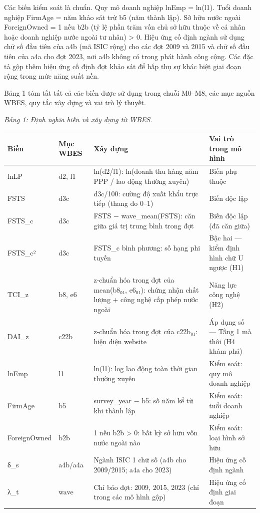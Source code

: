 \documentclass[12pt,a4paper]{article}
\begin{document}
Các biến kiểm soát là chuẩn. Quy mô doanh nghiệp lnEmp = ln(l1). Tuổi
doanh nghiệp FirmAge = năm khảo sát trừ b5 (năm thành lập). Sở hữu nước
ngoài ForeignOwned = 1 nếu b2b (tỷ lệ phần trăm vốn chủ sở hữu thuộc về
cá nhân hoặc doanh nghiệp nước ngoài tư nhân) \textgreater{} 0. Hiệu ứng
cố định ngành sử dụng chữ số đầu tiên của a4b (mã ISIC rộng) cho các đợt
2009 và 2015 và chữ số đầu tiên của a4a cho đợt 2023, nơi a4b không có
trong phát hành công cộng. Các đặc tả gộp thêm hiệu ứng cố định đợt khảo
sát để hấp thụ sự khác biệt giai đoạn rộng trong mức năng suất nền.

Bảng 1 tóm tắt tất cả các biến được sử dụng trong chuỗi M0--M8, các mục
nguồn WBES, quy tắc xây dựng và vai trò lý thuyết.

\emph{Bảng 1: Định nghĩa biến và xây dựng từ WBES.}

\begin{longtable}[]{@{}llll@{}}
\toprule\noalign{}
Biến & Mục WBES & Xây dựng & Vai trò trong mô hình \\
\midrule\noalign{}
\endhead
\bottomrule\noalign{}
\endlastfoot
lnLP & d2, l1 & ln(d2/l1): ln(doanh thu hàng năm PPP / lao động thường
xuyên) & Biến phụ thuộc \\
FSTS & d3c & d3c/100: cường độ xuất khẩu trực tiếp (thang đo 0--1) &
Biến độc lập \\
FSTS\_c & d3c & FSTS − wave\_mean(FSTS): căn giữa giá trị trung bình
trong đợt & Biến độc lập (đã căn giữa) \\
FSTS\_c² & d3c & FSTS\_c bình phương: số hạng phi tuyến & Bậc hai ---
kiểm định hình chữ U ngược (H1) \\
TCI\_z & b8, e6 & z-chuẩn hóa trong đợt của mean(b8₀₁, e6₀₁): chứng nhận
chất lượng + công nghệ cấp phép nước ngoài & Năng lực công nghệ (H2) \\
DAI\_z & c22b & z-chuẩn hóa trong đợt của c22b₀₁: hiện diện website & Áp
dụng số --- Tầng 1 mà thôi (H4 khám phá) \\
lnEmp & l1 & ln(l1): log lao động toàn thời gian thường xuyên & Kiểm
soát: quy mô doanh nghiệp \\
FirmAge & b5 & survey\_year − b5: số năm kể từ khi thành lập & Kiểm
soát: tuổi doanh nghiệp \\
ForeignOwned & b2b & 1 nếu b2b \textgreater{} 0: bất kỳ sở hữu vốn nước
ngoài nào & Kiểm soát: loại hình sở hữu \\
δ\_s & a4b/a4a & Ngành ISIC 1 chữ số (a4b cho 2009/2015; a4a cho 2023) &
Hiệu ứng cố định ngành \\
λ\_t & wave & Chỉ báo đợt: 2009, 2015, 2023 (chỉ trong các mô hình gộp)
& Hiệu ứng cố định giai đoạn \\
\end{longtable}
\end{document}
